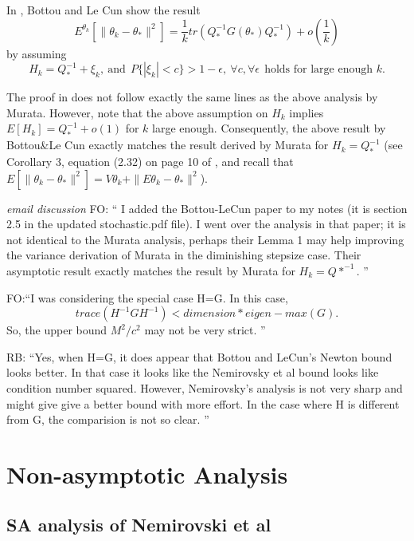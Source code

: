\documentclass[12pt]{article}
\begin{document}
In \cite{bottoulecun:2004}, Bottou and Le Cun show the result 
\[
 E^{\theta_k}[\|\theta_k-\theta_\ast\|^2] = \frac{1}{k}tr(Q_\ast^{-1}G(\theta_\ast)Q_\ast^{-1})+o(\frac{1}{k})
\]
by assuming 
\[
  H_k = Q_\ast^{-1} + \xi_k , \ \mbox{and}  \ \ P\{|\xi_k|<c\}>1-\epsilon, \ \forall c,\forall\epsilon \ \ \mbox{holds for large enough }k.
\]

The proof in \cite{bottoulecun:2004} does not follow exactly the same lines as the above analysis by Murata.  However, note that the above assumption on $H_k$ implies $E[H_k] = Q_\ast^{-1} + o(1)$ for $k$ large enough.  Consequently, the above result by Bottou\&Le Cun exactly matches the result derived by Murata for $H_k=Q_\ast^{-1}$ (see Corollary 3, equation (2.32) on page 10 of \cite{murata:1998}, and recall that $E[\|\theta_k-\theta_\ast\|^2] = V\theta_k + \|E\theta_k - \theta_\ast\|^2$).

\medskip\noindent\emph{email discussion} FO: `` I added the Bottou-LeCun paper to my notes (it is section 2.5 in the updated stochastic.pdf file).  I went over the analysis in that paper; it is not identical to the Murata analysis, perhaps their Lemma 1 may help improving the variance derivation of Murata in the diminishing stepsize case.  Their asymptotic result exactly matches the result by Murata for $H_k=Q*^{-1}. $ ''

FO:``I was considering the special case H=G.  In this case, 
\[
     trace(H^{-1} G H^{-1}) < dimension*eigen-max(G).
 \]  So, the upper bound $M^2/c^2$  may not be very strict. ''

RB: ``Yes, when H=G, it does appear that Bottou and LeCun's Newton bound looks better. In that case it looks like
the Nemirovsky et al bound looks like condition number squared. However, Nemirovsky's analysis is not very sharp and might give give a better bound with more effort. 
In the case where H is different from G, the comparision is not so clear. ''

\bigskip
\newpage%

\section{Non-asymptotic Analysis}

\subsection{SA analysis of Nemirovski et al\cite{nemirovski:2009}}
\end{document}
